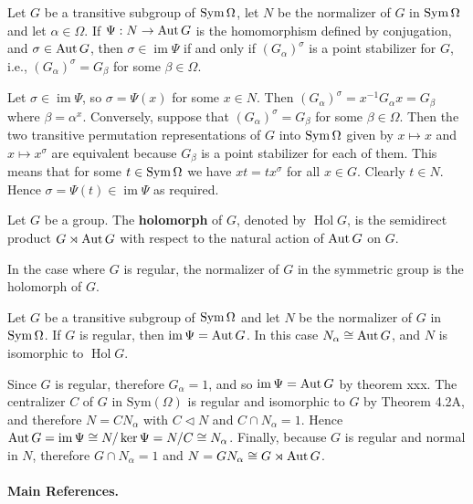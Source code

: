 \begin{theorem}
	Let $G$ be a transitive subgroup of $\operatorname{Sym}\Omega$, let $N$ be the normalizer of $G$ in $\operatorname{Sym} \Omega$ and let $\alpha \in \Omega$. If $\Psi:N\to \operatorname{Aut} G$ is the homomorphism defined by conjugation, and $\sigma \in \operatorname{Aut} G$, then
	$ \sigma \in \operatorname{im} \Psi$ if and only if $(G_\alpha)^\sigma$ is a point stabilizer for $G$, i.e., $(G_\alpha)^\sigma = G_\beta$ for some $\beta\in\Omega$.
\end{theorem}
\begin{sketch}
	Let $\sigma \in\operatorname{im} \Psi$, so $\sigma = \Psi(x)$ for some $x \in N$. Then $(G_\alpha)^\sigma = x^{-1}G_\alpha x = G_\beta$ where $\beta = \alpha^x$. Conversely, suppose that $(G_\alpha)^\sigma = G_\beta$ for some $\beta \in \Omega$. Then the two transitive permutation representations of $G$ into $\operatorname{Sym}\Omega$ given by $x \mapsto x$ and $x \mapsto x^\sigma$ are equivalent because $G_\beta$ is a point stabilizer for each of them. This means that for some $t \in \operatorname{Sym}\Omega$ we have $xt = tx^\sigma$ for all $x \in G$. Clearly $t \in N$. Hence $\sigma = \Psi(t) \in\operatorname{im} \Psi$ as required.
\end{sketch}

\begin{definition}
	Let $G$ be a group. The \textbf{holomorph} of $G$, denoted by $\operatorname{Hol} G$, is the semidirect product $G \rtimes \operatorname{Aut} G$ with respect to the natural action of $\operatorname{Aut} G$ on $G$.
\end{definition}
In the case where $G$ is regular,  the normalizer of $G$ in the symmetric group is the holomorph of $G$.
\begin{corollary}
	Let $G$ be a transitive subgroup of $\operatorname{Sym}\Omega$ and let $N$ be the normalizer of $G$ in $\operatorname{Sym} \Omega$. If $G$ is regular, then $\operatorname{im} \Psi = \operatorname{Aut} G$. In this case $N_\alpha \cong \operatorname{Aut} G$, and $N$ is isomorphic to $\operatorname{Hol}G$.
\end{corollary}
\begin{sketch}
	Since $G$ is regular, therefore $G_\alpha = 1$, and so $\operatorname{im} \Psi = \operatorname{Aut} G$ by theorem xxx. The centralizer $C$ of $G$ in $\text{Sym}(\Omega)$ is regular and isomorphic to $G$ by Theorem 4.2A, and therefore $N = CN_\alpha$ with $C \triangleleft N$ and $C \cap N_\alpha = 1$. Hence $\operatorname{Aut} G =\operatorname{im} \Psi \cong N/\ker \Psi = N/C \cong N_\alpha$. Finally, because $G$ is regular and normal in $N$, therefore $G \cap N_\alpha = 1$ and $N = GN_\alpha \cong G \rtimes \operatorname{Aut} G$.
\end{sketch} 

\paragraph{Main References.} \cite{Praeger2018,Dixon1996,Cameron1999}